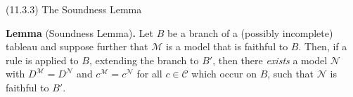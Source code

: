 \begin{frame}{(11.3.3) The Soundness Lemma}

\textbf{Lemma} (Soundness Lemma)\textbf{.} Let $B$ be a branch of a (possibly incomplete)
                      tableau and suppose further that $\mathcal{M}$
                      is a model that is faithful to $B$. Then, if a
                      rule is applied to $B$, extending the branch to
                      $B'$, then there \emph{exists} a model
                      $\mathcal{N}$ with
                      $D^\mathcal{M}=D^\mathcal{N}$ and
                      $c^\mathcal{M}=c^\mathcal{N}$ for all
                      $c\in\mathcal{C}$ which occur on $B$, such that
                      $\mathcal{N}$ is faithful to $B'$.
      
  
\end{frame}

